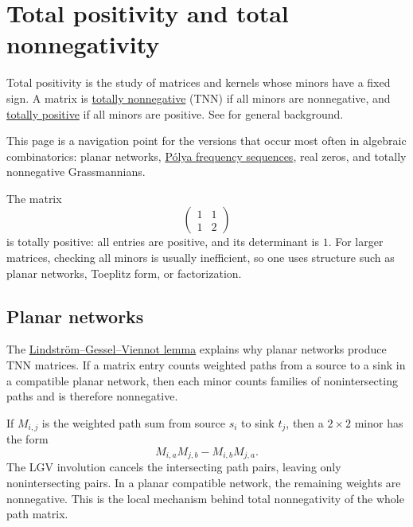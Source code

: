 
\section[totalPositivity]{Total positivity and total nonnegativity}

Total positivity is the study of matrices and kernels whose minors have a
fixed sign.  A matrix is \hyperref[totallyNonnegative]{totally nonnegative}
(TNN) if all minors are nonnegative, and
\hyperref[totallyPositiveMatrix]{totally positive} if all minors are
positive.  See \cite{Karlin1968,FallatJohnson2011} for general background.

This page is a navigation point for the versions that occur most often in
algebraic combinatorics: planar networks,
\hyperref[polyaFrequencySequenceDefinition]{Pólya frequency sequences}, real
zeros, and totally nonnegative Grassmannians.

\begin{example}
The matrix
\[
  \begin{pmatrix}
  1 & 1\\
  1 & 2
  \end{pmatrix}
\]
is totally positive: all entries are positive, and its determinant is \(1\).
For larger matrices, checking all minors is usually inefficient, so one uses
structure such as planar networks, Toeplitz form, or factorization.
\end{example}

\subsection[totalPositivityNetworks]{Planar networks}

The \hyperref[lgvLemma]{Lindström--Gessel--Viennot lemma} explains why planar
networks produce TNN matrices.  If a matrix entry counts weighted paths from
a source to a sink in a compatible planar network, then each minor counts
families of nonintersecting paths and is therefore nonnegative.

If \(M_{i,j}\) is the weighted path sum from source \(s_i\) to sink \(t_j\),
then a \(2\times2\) minor has the form
\[
  M_{i,a}M_{j,b}-M_{i,b}M_{j,a}.
\]
The LGV involution cancels the intersecting path pairs, leaving only
nonintersecting pairs.  In a planar compatible network, the remaining weights
are nonnegative.  This is the local mechanism behind total nonnegativity of
the whole path matrix.

